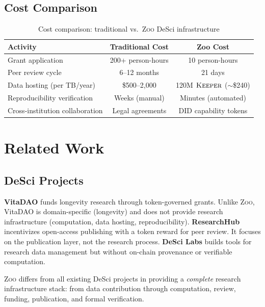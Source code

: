 \documentclass[11pt,letterpaper]{article}
\theoremstyle{definition}
\theoremstyle{remark}
\newcommand{\Zoo}{\textsc{Zoo}}
\newcommand{\KEEPER}{\textsc{Keeper}}
\newcommand{\DID}{\textsc{DID}}
\begin{document}
\subsection{Cost Comparison}

\begin{table}[h]
\centering
\begin{tabular}{lcc}
\toprule
\textbf{Activity} & \textbf{Traditional Cost} & \textbf{Zoo Cost} \\
\midrule
Grant application & 200+ person-hours & 10 person-hours \\
Peer review cycle & 6--12 months & 21 days \\
Data hosting (per TB/year) & \$500--2,000 & 120M $\KEEPER$ ($\sim$\$240) \\
Reproducibility verification & Weeks (manual) & Minutes (automated) \\
Cross-institution collaboration & Legal agreements & \DID{} capability tokens \\
\bottomrule
\end{tabular}
\caption{Cost comparison: traditional vs.\ \Zoo{} DeSci infrastructure}
\label{tab:cost_comparison}
\end{table}

\section{Related Work}
\label{sec:related}

\subsection{DeSci Projects}

\textbf{VitaDAO} funds longevity research through token-governed grants. Unlike \Zoo{}, VitaDAO is domain-specific (longevity) and does not provide research infrastructure (computation, data hosting, reproducibility). \textbf{ResearchHub} incentivizes open-access publishing with a token reward for peer review. It focuses on the publication layer, not the research process. \textbf{DeSci Labs} builds tools for research data management but without on-chain provenance or verifiable computation.

\Zoo{} differs from all existing DeSci projects in providing a \emph{complete} research infrastructure stack: from data contribution through computation, review, funding, publication, and formal verification.
\end{document}

